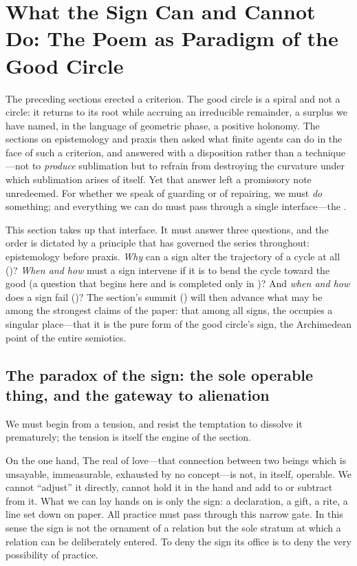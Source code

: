\section{What the Sign Can and Cannot Do: The Poem as Paradigm of the Good Circle}
\label{p09:sec:semiotics}

The preceding sections erected a criterion. The good circle is a spiral and not a circle: it returns to its root while accruing an irreducible remainder, a surplus we have named, in the language of geometric phase, a positive holonomy. The sections on epistemology and praxis then asked what finite agents can do in the face of such a criterion, and answered with a disposition rather than a technique---not to \emph{produce} sublimation but to refrain from destroying the curvature under which sublimation arises of itself. Yet that answer left a promissory note unredeemed. For whether we speak of guarding or of repairing, we must \emph{do} something; and everything we can do must pass through a single interface---the .

This section takes up that interface. It must answer three questions, and the order is dictated by a principle that has governed the series throughout: epistemology before praxis. \emph{Why} can a sign alter the trajectory of a cycle at all ()? \emph{When and how} must a sign intervene if it is to bend the cycle toward the good (a question that begins here and is completed only in )? And \emph{when and how} does a sign fail ()? The section's summit () will then advance what may be among the strongest claims of the paper: that among all signs, the  occupies a singular place---that it is the pure form of the good circle's sign, the Archimedean point of the entire semiotics.

\subsection{The paradox of the sign: the sole operable thing, and the gateway to alienation}
\label{p09:sec:symbol-paradox}

We must begin from a tension, and resist the temptation to dissolve it prematurely; the tension is itself the engine of the section.

On the one hand,  The real of love---that connection between two beings which is unsayable, immeasurable, exhausted by no concept---is not, in itself, operable. We cannot ``adjust'' it directly, cannot hold it in the hand and add to or subtract from it. What we can lay hands on is only the sign: a declaration, a gift, a rite, a line set down on paper. All practice must pass through this narrow gate. In this sense the sign is not the ornament of a relation but the sole stratum at which a relation can be deliberately entered. To deny the sign its office is to deny the very possibility of practice.

